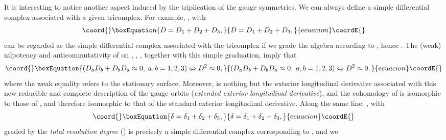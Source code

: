 \documentclass[a4paper,12pt]{article}
\begin{document}
It is interesting to notice another aspect induced by the triplication of
the gauge symmetries. We can always define a simple differential complex
associated with a given tricomplex. For example, \coordHE{}, with 
\begin{equation}\coord{}\boxEquation{
D=D_{1}+D_{2}+D_{3},  \label{sp3.e}
}{
D=D_{1}+D_{2}+D_{3},  }{ecuacion}\coordE{}\end{equation}
can be regarded as the simple differential complex associated with the
tricomplex \coordHE{}
if we grade the algebra \coordHE{} according to \coordHE{}, hence \coordHE{}. The (weak) nilpotency and anticommutativity of \coordHE{} on \coordHE{}, \coordHE{}, \coordHE{}, together with this simple
graduation, imply that 
\begin{equation}\coord{}\boxEquation{
\left( D_{a}D_{b}+D_{b}D_{a}\approx 0,\;a,b=1,2,3\right) \Leftrightarrow
D^{2}\approx 0,  \label{sp3.f}
}{
\left( D_{a}D_{b}+D_{b}D_{a}\approx 0,\;a,b=1,2,3\right) \Leftrightarrow
D^{2}\approx 0,  }{ecuacion}\coordE{}\end{equation}
where the weak equality refers to the stationary surface. Moreover, \coordHE{} is
nothing but the exterior longitudinal derivative associated with this new
reducible and complete description of the gauge orbits (\textit{extended
exterior longitudinal derivative}), and the cohomology of \coordHE{} is isomorphic
to those of \coordHE{}, and therefore isomorphic to
that of the standard exterior longitudinal derivative. Along the same line, \coordHE{}, with 
\begin{equation}\coord{}\boxEquation{
\delta =\delta _{1}+\delta _{2}+\delta _{3},  \label{sp3.g}
}{
\delta =\delta _{1}+\delta _{2}+\delta _{3},  }{ecuacion}\coordE{}\end{equation}
graded by the \textit{total resolution degree} \coordHE{} (\coordHE{}) is precisely a simple differential complex corresponding to \coordHE{}, and we
\end{document}
